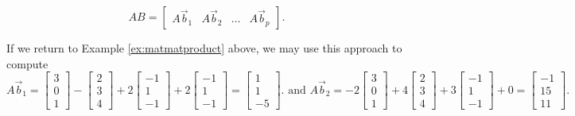\documentclass{ximera}
\begin{document}
$$AB = \begin{bmatrix} A\vec{b}_1 & A\vec{b}_2 & \dots & A\vec{b}_p \end{bmatrix}.
$$

If we return to Example \ref{ex:matmatproduct} above, we may use this approach to compute
$$A\vec{b}_1=\begin{bmatrix}3\\0\\1\end{bmatrix}
-\begin{bmatrix}2\\3\\4\end{bmatrix}
+2\begin{bmatrix}-1\\1\\-1\end{bmatrix}
+2\begin{bmatrix}-1\\1\\-1\end{bmatrix} 
= \begin{bmatrix}1\\1\\-5\end{bmatrix}.
\text{ and }
A\vec{b}_2=-2\begin{bmatrix}3\\0\\1\end{bmatrix}
+4\begin{bmatrix}2\\3\\4\end{bmatrix}
+3\begin{bmatrix}-1\\1\\-1\end{bmatrix}+0 = \begin{bmatrix}-1\\15\\11\end{bmatrix}.
$$
\end{document}
